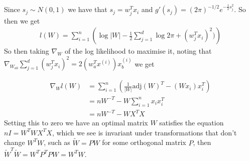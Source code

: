 %
%
\begin{answer}
Since $s_j \sim N(0, 1)$ we have that $s_j = w_j^T x_i$ and $g'(s_j) = (2 \pi)^{-1/2} e^{-\frac{1}{2} s_j^2}$. So then we get
\begin{align*}
l(W) 
= \sum_{i=1}^n \left ( 
	\log |W| - \frac{1}{2} \sum_{j=1}^d \log 2 \pi + (w_j^T x_i)^2)
\right)
\end{align*}
So then taking $\nabla_W$ of the log  likelihood to maximise it, noting that $\nabla_{W_{ab}} \sum_{j=1}^d (w_j^T x_i)^2 = 2(w_a^T x^{(i)}) x^{(i)}_b$
we get

\begin{align*}
\nabla_W l(W) &=
\sum_{i=1}^n \left ( 
\frac{1}{|W|} \text{adj}(W)^T - (W x_i)x_i^T
\right)
\\
&= n W^{-T} - W \sum_{i=1}^n x_i x_i^T
\\
&= n W^{-T} - W X^T X 
\end{align*}
Setting this to zero we have an optimal matrix $W$ satisfies the equation $nI = W^T W X^T X$, which we see is invariant under transformations that don't change $W^T W$, such as $\tilde{W} = PW$ for some orthogonal matrix $P$, then $\tilde{W}^T \tilde{W} = W^T P^T P W = W^T W$.
\end{answer}
%
